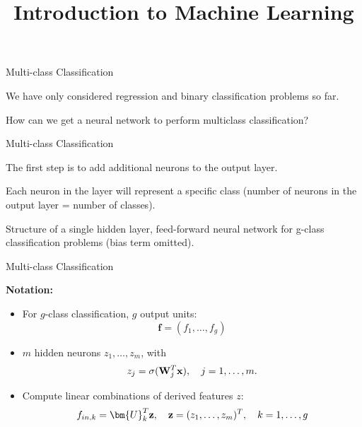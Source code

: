 \documentclass[11pt,compress,t,notes=noshow, xcolor=table]{beamer}
\title{Introduction to Machine Learning}
\begin{document}



\begin{framei}[sep=L]{Multi-class Classification}
\vfill
\item We have only considered regression and binary classification problems so far.
\vfill
\item How can we get a neural network to perform multiclass classification?
\vfill
\end{framei}

\begin{framei} {Multi-class Classification}
\item The first step is to add additional neurons to the output layer.
\item Each neuron in the layer will represent a specific class (number of neurons in the output layer = number of classes).
\centerline{\footnotesize Structure of a single hidden layer, feed-forward neural network for g-class classification problems (bias term omitted).}
\end{framei}

\begin{framei} {Multi-class Classification}
\vfill
\item \textbf{Notation:}
\begin{itemize}
\item For $g$-class classification, $g$ output units: $$\mathbf{f} = (f_1, \dots, f_g)$$
\item $m$ hidden neurons $z_1, \dots, z_m$, with
    $$ z_j = \sigma(\mathbf{W}_j^T \mathbf{x}), \quad j = 1,\ldots,m. $$
\item Compute linear combinations of derived features $z$:
    $$ f_{in,k} = \bm{U}_k^T \hidz, \quad \hidz=(z_1,\dots, z_m)^T, \quad k = 1,\ldots,g$$
\end{itemize}
\end{framei}
\end{document}
